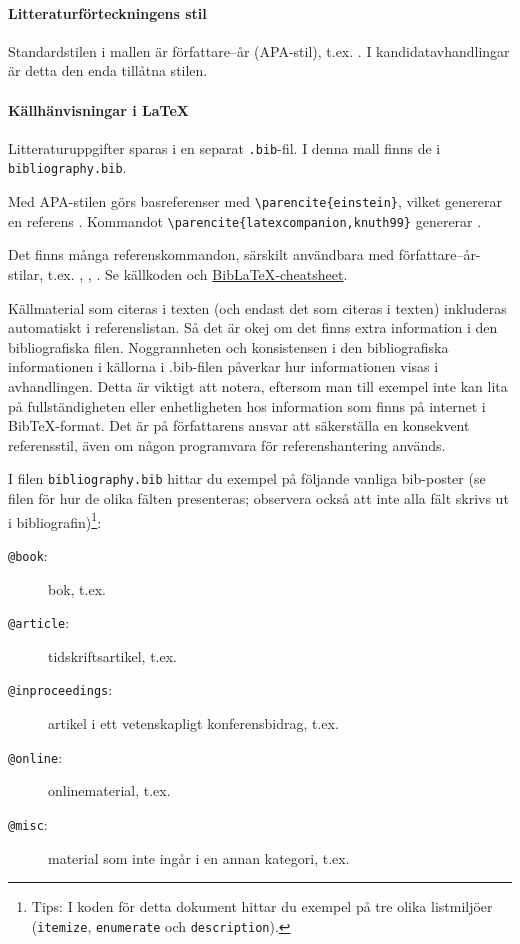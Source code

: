 \documentclass[swedish, manual, a4paper]{csthesis}
\begin{document}
\paragraph{Litteraturförteckningens stil}
Standardstilen i mallen är författare–år (APA-stil), t.ex. \parencite{einstein}. I kandidatavhandlingar är detta den enda tillåtna stilen.

\paragraph{Källhänvisningar i \LaTeX}
Litteraturuppgifter sparas i en separat \texttt{.bib}-fil. I denna mall finns de i \texttt{bibliography.bib}.

Med APA-stilen görs basreferenser med \texttt{\textbackslash parencite\{einstein\}}, vilket genererar en referens \parencite{einstein}. Kommandot \texttt{\textbackslash parencite\{latexcompanion,knuth99\}} genererar \parencite{latexcompanion,knuth99}.

Det finns många referenskommandon, särskilt användbara med författare–år-stilar, t.ex. \textcite{einstein}, \citeauthor{einstein}, \citeyear{einstein}. Se källkoden och \href{https://tug.ctan.org/info/biblatex-cheatsheet/biblatex-cheatsheet.pdf}{Bib\LaTeX‑cheatsheet}.

Källmaterial som citeras i texten (och endast det som citeras i texten) inkluderas automatiskt i referenslistan. Så det är okej om det finns extra information i den bibliografiska filen. Noggrannheten och konsistensen i den bibliografiska informationen i källorna i .bib-filen påverkar hur informationen visas i avhandlingen. Detta är viktigt att notera, eftersom man till exempel inte kan lita på fullständigheten eller enhetligheten hos information som finns på internet i {Bib\TeX}-format. Det är på författarens ansvar att säkerställa en konsekvent referensstil, även om någon programvara för referenshantering används.

I filen \texttt{bibliography.bib} hittar du exempel på följande vanliga bib-poster (se filen för hur de olika fälten presenteras; observera också att inte alla fält skrivs ut i bibliografin)\footnote{Tips: I koden för detta dokument hittar du exempel på tre olika listmiljöer (\texttt{itemize}, \texttt{enumerate} och \texttt{description}).}:
\begin{description}
\item[\texttt{@book}:] bok, t.ex. \parencite{deep-learning-book,latexcompanion,knuth99}
\item[\texttt{@article}:] tidskriftsartikel, t.ex. \parencite{JanzenS05,einstein}
\item[\texttt{@inproceedings}:] artikel i ett vetenskapligt konferensbidrag, t.ex. \parencite{HiltonTHMD16}
\item[\texttt{@online}:] onlinematerial, t.ex. \parencite{knuthwebsite}
\item[\texttt{@misc}:] material som inte ingår i en annan kategori, t.ex. \parencite{tieteellinenkirjoittaminen}
\end{description}
\end{document}
